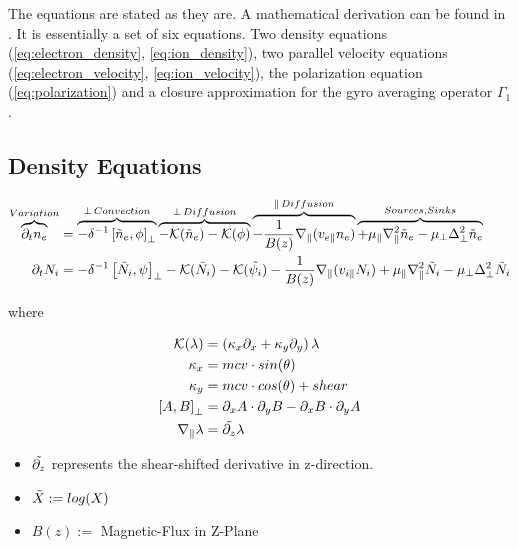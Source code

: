 The equations are stated as they are. A mathematical derivation can be found in \cite{HeldDisseration}. It is essentially a set of six equations. Two density equations (\autoref{eq:electron_density}, \autoref{eq:ion_density}), two parallel velocity equations (\autoref{eq:electron_velocity}, \autoref{eq:ion_velocity}), the polarization equation (\autoref{eq:polarization}) and a closure approximation for the gyro averaging operator $\Gamma_1$.

\subsection{Density Equations}

\begin{align}
    \overbrace{\partial_t n_e}^{Variation} &=
    \overbrace{-\delta^{-1} \left[\Tilde{n}_e, \phi \right]_{\perp}}^{\perp \, Convection}
    \overbrace{
    - \mathcal{K}(\Tilde{n}_e)
    - \mathcal{K}(\phi)
    }^{\perp \, Diffusion}
    \overbrace{
    - \frac{1}{B(z)}\nabla_\parallel (v_{e\parallel} n_e)
    }^{\parallel \, Diffusion}
    \overbrace{
    + \mu_\parallel \nabla_\parallel^2\Tilde{n}_e
    - \mu_\perp \Delta^2_\perp\Tilde{n}_e
    }^{Sources, Sinks}
    \label{eq:electron_density}
    \\
    \partial_t N_i &=
    -\delta^{-1} \left[\Tilde{N}_i, \psi \right]_{\perp}
    - \mathcal{K}(\Tilde{N}_i)
    - \mathcal{K}(\Tilde{\psi_i})
    - \frac{1}{B(z)}\nabla_\parallel (v_{i\parallel} N_i)
    + \mu_\parallel \nabla_\parallel^2\Tilde{N}_i
    - \mu_\perp \Delta^2_\perp\Tilde{N}_i \label{eq:ion_density}
\end{align}

where

\begin{align}
    \mathcal{K}(\lambda) &= (\kappa_x \partial_x + \kappa_y \partial_y)\,\lambda\\
    \kappa_x &= mcv \cdot sin(\theta)\\
    \kappa_y &= mcv \cdot cos(\theta) + shear\\
    \left[A, B\right]_\perp &= \partial_x A \cdot \partial_y B - \partial_x B \cdot \partial_y A\\
    \nabla_\parallel \lambda &= \Tilde{\partial_{z}} \lambda
\end{align}
\begin{itemize}
    \item $\Tilde{\partial_{z}}$ represents the shear-shifted derivative in z-direction.
    \item $\Tilde{X} := log(X)$
    \item $B(z) := $ Magnetic-Flux in Z-Plane
\end{itemize}


